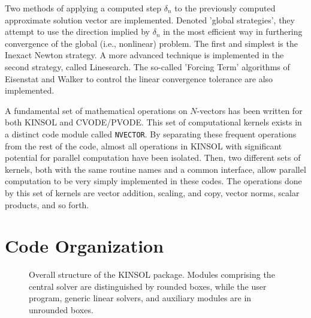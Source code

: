 \documentclass[11pt]{article}
\begin{document}
Two methods of applying a computed step $\delta_n$ to the previously computed
approximate solution vector are implemented. Denoted 'global strategies',
they attempt to use the direction implied by $\delta_n$ in the most efficient 
way in furthering convergence of the global (i.e., nonlinear) problem. The 
first and simplest is the Inexact Newton strategy.  A more advanced technique 
is implemented in the second strategy, called Linesearch. The so-called 
'Forcing Term' algorithms of Eisenstat and Walker \cite{EiWa96} to control the 
linear convergence tolerance are also implemented. 

A fundamental set of mathematical operations on $N$-vectors has been written
for both KINSOL and CVODE/PVODE. This set of computational kernels exists in
a distinct code module called {\tt NVECTOR}. By separating these frequent 
operations from the rest of the code, almost all operations in KINSOL with 
significant potential for parallel computation have been isolated. Then, two
different sets of kernels, both with the same routine names and a common 
interface, allow parallel computation to be very simply implemented in these 
codes. The operations done by this set of kernels are vector addition, 
scaling, and copy, vector norms, scalar products, and so forth.

\section{Code Organization}

\begin{figure}[p]
\centerline{}
\caption{Overall structure of the KINSOL package.
  Modules comprising the central solver are distinguished by rounded
  boxes, while the user program, generic linear solvers, and auxiliary
  modules are in unrounded boxes.} 
\label{fig-kinorg}
\end{figure}
\end{document}
